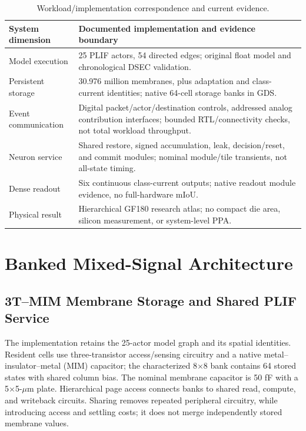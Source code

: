 \documentclass[preprint,12pt,number]{elsarticle}
\begin{document}
\begin{table}[t]
\centering\small
\caption{Workload/implementation correspondence and current evidence.}
\label{tab:cosystem}
\begin{tabularx}{\textwidth}{p{}X}
\toprule
System dimension & Documented implementation and evidence boundary \\
\midrule
Model execution & 25 PLIF actors, 54 directed edges; original float model and chronological DSEC validation. \\
Persistent storage & 30.976 million membranes, plus adaptation and class-current identities; native 64-cell storage banks in GDS. \\
Event communication & Digital packet/actor/destination controls, addressed analog contribution interfaces; bounded RTL/connectivity checks, not total workload throughput. \\
Neuron service & Shared restore, signed accumulation, leak, decision/reset, and commit modules; nominal module/tile transients, not all-state timing. \\
Dense readout & Six continuous class-current outputs; native readout module evidence, no full-hardware mIoU. \\
Physical result & Hierarchical GF180 research atlas; no compact die area, silicon measurement, or system-level PPA. \\
\bottomrule
\end{tabularx}
\end{table}

\section{Banked Mixed-Signal Architecture}
\label{sec:asic}
\subsection{3T--MIM Membrane Storage and Shared PLIF Service}
The implementation retains the 25-actor model graph and its spatial identities. Resident cells use three-transistor access/sensing circuitry and a native metal--insulator--metal (MIM) capacitor; the characterized 8$\times$8 bank contains 64 stored states with shared column bias. The nominal membrane capacitor is 50 fF with a 5$\times$5-$\mu$m plate. Hierarchical page access connects banks to shared read, compute, and writeback circuits. Sharing removes repeated peripheral circuitry, while introducing access and settling costs; it does not merge independently stored membrane values.
\end{document}

